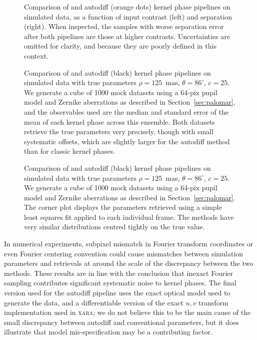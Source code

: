 \documentclass[modern]{aastex63}
\begin{document}
\begin{figure}
\caption{Comparison of \citet[][blue stars]{martinache20} and autodiff (orange dots) kernel phase pipelines on simulated data, as a function of input contrast (left) and separation (right). When inspected, the samples with worse separation error after both pipelines are those at higher contrasts. Uncertainties are omitted for clarity, and because they are poorly defined in this context. \label{method_comparison_ensemble}}
\end{figure}

\begin{figure}
\caption{Comparison of \citet[][blue linetype]{martinache20} and autodiff (black) kernel phase pipelines on simulated data with true parameters $\rho = 125$~mas, $\theta = 86^\circ$, $c=25$. We generate a cube of 1000 mock datasets using a 64-pix pupil model and Zernike aberrations as described in Section~\ref{sec:palomar}, and the observables used are the median and standard error of the mean of each kernel phase across this ensemble. Both datasets retrieve the true parameters very precisely, though with small systematic offsets, which are slightly larger for the autodiff method than for classic kernel phases. \label{comparison_posterior_sim}}
\end{figure}


\begin{figure}
\caption{Comparison of \citet[][blue linetype]{martinache20} and autodiff (black) kernel phase pipelines on simulated data with true parameters $\rho = 125$~mas, $\theta = 86^\circ$, $c=25$. We generate a cube of 1000 mock datasets using a 64-pix pupil model and Zernike aberrations as described in Section~\ref{sec:palomar}. The corner plot displays the parameters retrieved using a simple least squares fit applied to each individual frame. The methods have very similar distributions centred tightly on the true value. \label{comparison_posterior_sim_cube}}
\end{figure}

In numerical experiments, subpixel mismatch in Fourier transform coordinates or even Fourier centering convention could cause mismatches between simulation parameters and retrievals at around the scale of the discrepancy between the two methods.  These results are in line with the \citet{martinache_habilitation} conclusion that inexact Fourier sampling contributes significant systematic noise to kernel phases. The final version used for the autodiff pipeline uses the exact optical model used to generate the data, and a differentiable version of the exact $u,v$ transform implementation used in \textsc{xara}; we do not believe this to be the main cause of the small discrepancy between autodiff and conventional parameters, but it does illustrate that model mis-specification may be a contributing factor.
\end{document}
